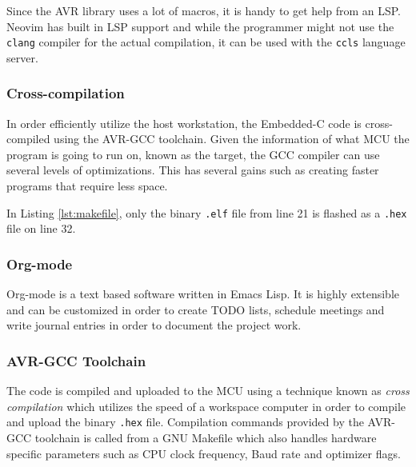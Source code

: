 Since the AVR library uses a lot of macros, it is handy to get help from an LSP. Neovim has built in LSP support and while the programmer might not use the \verb|clang| compiler for the actual compilation, it can be used with the \verb|ccls| language server.



\subsubsection{Cross-compilation}%
\label{ssub:cross_compilation}
In order efficiently utilize the host workstation, the Embedded-C code is cross-compiled using the AVR-GCC toolchain. Given the information of what MCU the program is going to run on, known as the target, the GCC compiler can use several levels of optimizations. This has several gains such as creating faster programs that require less space.



In Listing \ref{lst:makefile}, only the binary \verb|.elf| file from line 21 is flashed as a \verb|.hex| file on line 32. 
\subsubsection{Org-mode}%
\label{ssub:org_mode}
Org-mode is a text based software written in Emacs Lisp. It is highly extensible and can be customized in order to create TODO lists, schedule meetings and write journal entries in order to document the project work.

\subsubsection{AVR-GCC Toolchain}%
\label{ssub:avr_gcc_toolchain}
The code is compiled and uploaded to the MCU using a technique known as \textit{cross compilation} which utilizes the speed of a workspace computer in order to compile and upload the binary \verb|.hex| file. Compilation commands provided by the AVR-GCC toolchain is called from a GNU Makefile which also handles hardware specific parameters such as CPU clock frequency, Baud rate and optimizer flags. 


